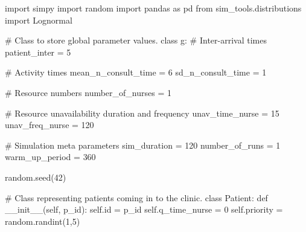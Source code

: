\documentclass[
  letterpaper,
  DIV=11,
  numbers=noendperiod]{scrreprt}
\newenvironment{Shaded}{\begin{snugshade}}{\end{snugshade}}
\newcommand{\BuiltInTok}[1]{\textcolor[rgb]{0.00,0.23,0.31}{#1}}
\newcommand{\CommentTok}[1]{\textcolor[rgb]{0.37,0.37,0.37}{#1}}
\newcommand{\DecValTok}[1]{\textcolor[rgb]{0.68,0.00,0.00}{#1}}
\newcommand{\FunctionTok}[1]{\textcolor[rgb]{0.28,0.35,0.67}{#1}}
\newcommand{\ImportTok}[1]{\textcolor[rgb]{0.00,0.46,0.62}{#1}}
\newcommand{\KeywordTok}[1]{\textcolor[rgb]{0.00,0.23,0.31}{#1}}
\newcommand{\NormalTok}[1]{\textcolor[rgb]{0.00,0.23,0.31}{#1}}
\newcommand{\OperatorTok}[1]{\textcolor[rgb]{0.37,0.37,0.37}{#1}}
\newcommand{\VariableTok}[1]{\textcolor[rgb]{0.07,0.07,0.07}{#1}}
\begin{document}
\begin{tcolorbox}[enhanced jigsaw, rightrule=.15mm, colback=white, colframe=quarto-callout-note-color-frame, colbacktitle=quarto-callout-note-color!10!white, toprule=.15mm, coltitle=black, opacityback=0, titlerule=0mm, bottomtitle=1mm, breakable, title=\textcolor{quarto-callout-note-color}{\faInfo}\hspace{0.5em}{Note}, opacitybacktitle=0.6, toptitle=1mm, arc=.35mm, bottomrule=.15mm, leftrule=.75mm, left=2mm]

\begin{Shaded}
\begin{Highlighting}[]
\ImportTok{import}\NormalTok{ simpy}
\ImportTok{import}\NormalTok{ random}
\ImportTok{import}\NormalTok{ pandas }\ImportTok{as}\NormalTok{ pd}
\ImportTok{from}\NormalTok{ sim\_tools.distributions }\ImportTok{import}\NormalTok{ Lognormal}


\CommentTok{\# Class to store global parameter values.}
\KeywordTok{class}\NormalTok{ g:}
    \CommentTok{\# Inter{-}arrival times}
\NormalTok{    patient\_inter }\OperatorTok{=} \DecValTok{5}

    \CommentTok{\# Activity times}
\NormalTok{    mean\_n\_consult\_time }\OperatorTok{=} \DecValTok{6}
\NormalTok{    sd\_n\_consult\_time }\OperatorTok{=} \DecValTok{1}

    \CommentTok{\# Resource numbers}
\NormalTok{    number\_of\_nurses }\OperatorTok{=} \DecValTok{1}

    \CommentTok{\# Resource unavailability duration and frequency}
\NormalTok{    unav\_time\_nurse }\OperatorTok{=} \DecValTok{15}
\NormalTok{    unav\_freq\_nurse }\OperatorTok{=} \DecValTok{120}

    \CommentTok{\# Simulation meta parameters}
\NormalTok{    sim\_duration }\OperatorTok{=} \DecValTok{120}
\NormalTok{    number\_of\_runs }\OperatorTok{=} \DecValTok{1}
\NormalTok{    warm\_up\_period }\OperatorTok{=} \DecValTok{360}

\NormalTok{    random.seed(}\DecValTok{42}\NormalTok{)}

\CommentTok{\# Class representing patients coming in to the clinic.}
\KeywordTok{class}\NormalTok{ Patient:}
    \KeywordTok{def} \FunctionTok{\_\_init\_\_}\NormalTok{(}\VariableTok{self}\NormalTok{, p\_id):}
        \VariableTok{self}\NormalTok{.}\BuiltInTok{id} \OperatorTok{=}\NormalTok{ p\_id}
        \VariableTok{self}\NormalTok{.q\_time\_nurse }\OperatorTok{=} \DecValTok{0}
        \VariableTok{self}\NormalTok{.priority }\OperatorTok{=}\NormalTok{ random.randint(}\DecValTok{1}\NormalTok{,}\DecValTok{5}\NormalTok{)}


\end{Highlighting}
\end{Shaded}
\end{tcolorbox}
\end{document}
